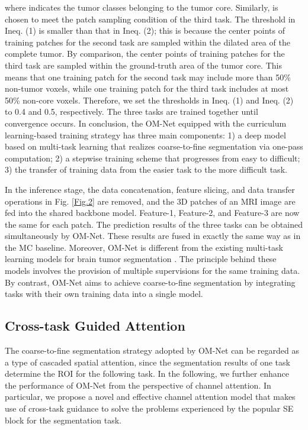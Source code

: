 \documentclass[journal,twoside]{IEEEtran}
\begin{document}
where  indicates the tumor classes belonging to the tumor core. Similarly,  is chosen to meet the patch sampling condition of the third task. The threshold in Ineq. (1) is smaller than that in Ineq. (2); this is because the center points of training patches for the second task are sampled within the dilated area of the complete tumor. By comparison, the center points of training patches for the third task are sampled within the ground-truth area of the tumor core. This means that one training patch for the second task may include more than 50\% non-tumor voxels, while one training patch for the third task includes at most 50\% non-core voxels. Therefore, we set the thresholds in Ineq. (1) and Ineq. (2) to 0.4 and 0.5, respectively. The three tasks are trained together until convergence occurs. In conclusion, the OM-Net equipped with the curriculum learning-based training strategy has three main components: 1) a deep model based on multi-task learning that realizes coarse-to-fine segmentation via one-pass computation; 2) a stepwise training scheme that progresses from easy to difficult; 3) the transfer of training data from the easier task to the more difficult task.



In the inference stage, the data concatenation, feature slicing, and data transfer operations in Fig. \ref{Fig.2} are removed, and the 3D patches of an MRI image are fed into the shared backbone model. Feature-1, Feature-2, and Feature-3 are now the same for each patch. The prediction results of the three tasks can be obtained simultaneously by OM-Net. These results are fused in exactly the same way as in the MC baseline. Moreover, OM-Net is different from the existing multi-task learning models for brain tumor segmentation \cite{shen2017multi,shen2017boundary}. 
The principle behind these models \cite{shen2017multi,shen2017boundary} involves the provision of multiple supervisions for the same training data. By contrast, OM-Net aims to achieve coarse-to-fine segmentation by
integrating tasks with their own training data into a single model.







\subsection{Cross-task Guided Attention}

The coarse-to-fine segmentation strategy adopted by OM-Net can be regarded as a type of cascaded spatial attention, since the segmentation results of one task determine the ROI for the following task. In the following, we further enhance the performance of OM-Net from the perspective of channel attention. In particular, we propose a novel and effective channel attention model that makes use of cross-task guidance to solve the problems experienced by the popular SE block for the segmentation task. 
\end{document}

